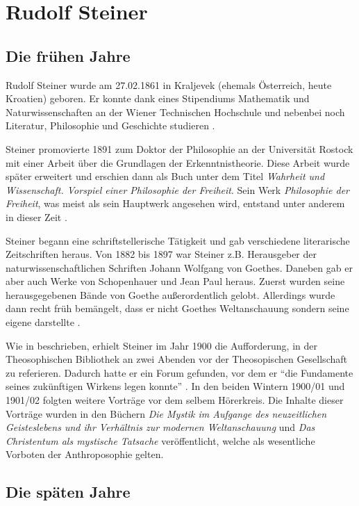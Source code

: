 \section{Rudolf Steiner}
\subsection{Die frühen Jahre}
Rudolf Steiner wurde am 27.02.1861 in Kraljevek (ehemals Österreich, heute Kroatien) geboren. Er konnte dank eines Stipendiums Mathematik und Naturwissenschaften an der Wiener Technischen Hochschule und nebenbei noch Literatur, Philosophie und Geschichte studieren \citep[vgl.][]{wikipedia}.

Steiner promovierte 1891 zum Doktor der Philosophie an der Universität Rostock mit einer Arbeit über die Grundlagen der Erkenntnistheorie. Diese Arbeit wurde später erweitert und erschien dann als Buch unter dem Titel \emph{Wahrheit und Wissenschaft. Vorspiel einer Philosophie der Freiheit}. Sein Werk \emph{Philosophie der Freiheit}, was meist als sein Hauptwerk angesehen wird, entstand unter anderem in dieser Zeit \citep[vgl.][]{steiner}.

Steiner begann eine schriftstellerische Tätigkeit und gab verschiedene literarische Zeitschriften heraus. Von 1882 bis 1897 war Steiner z.B. Herausgeber der naturwissenschaftlichen Schriften Johann Wolfgang von Goethes. Daneben gab er aber auch Werke von Schopenhauer und Jean Paul heraus. Zuerst wurden seine herausgegebenen Bände von Goethe außerordentlich gelobt. Allerdings wurde dann recht früh bemängelt, dass er nicht Goethes Weltanschauung sondern seine eigene darstellte \citep[vgl.][]{steiner, wikipedia}.

Wie in \citet{hemleben63} beschrieben, erhielt Steiner im Jahr 1900 die Aufforderung, in der Theosophischen Bibliothek an zwei Abenden vor der Theosopischen Gesellschaft zu referieren. Dadurch hatte er ein Forum gefunden, vor dem er \enquote{die Fundamente seines zukünftigen Wirkens legen konnte} . In den beiden Wintern 1900/01 und 1901/02 folgten weitere Vorträge vor dem selbem Hörerkreis. Die Inhalte dieser Vorträge wurden in den Büchern \emph{Die Mystik im Aufgange des neuzeitlichen Geisteslebens und ihr Verhältnis zur modernen Weltanschauung} und \emph{Das Christentum als mystische Tatsache} veröffentlicht, welche als wesentliche Vorboten der Anthroposophie gelten.

\subsection{Die späten Jahre} %
\label{sub:biographie_steiner_in_seinen_sp_ten_jahren}

